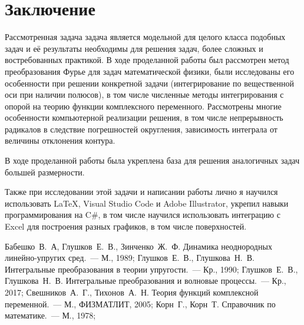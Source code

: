 \documentclass[a4paper, 12pt]{article}
\begin{document}
\section*{Заключение}
Рассмотренная задача задача является модельной для целого класса подобных задач и её результаты необходимы для решения задач, более сложных и востребованных практикой.
В ходе проделанной работы был рассмотрен метод преобразования Фурье для задач математической физики, были исследованы его особенности при решении конкретной задачи (интегрирование по вещественной оси при наличии полюсов), в том числе численные методы интегрирования с опорой на теорию функции комплексного переменного.
Рассмотрены многие особенности компьютерной реализации решения, в том числе непрерывность радикалов в следствие погрешностей округления, зависимость интеграла от величины отклонения контура.

В ходе проделанной работы была укреплена база для решения аналогичных задач большей размерности.

Также при исследовании этой задачи и написании работы лично я научился использовать \LaTeX, Visual Studio Code и Adobe Illustrator, укрепил навыки программирования на C$\#$, в том числе научился использовать интеграцию с Excel для построения разных графиков, в том числе поверхностей.


\begin{thebibliography}{999} 
    Бабешко~В.~А, Глушков~Е.~В., Зинченко~Ж.~Ф. Динамика неоднородных линейно-упругих сред.~---
    М., 1989;
    Глушков~Е.~В., Глушкова~Н.~В. Интегральные преобразования в теории упругости.~---
    Кр., 1990;
    Глушков~Е.~В., Глушкова~Н.~В. Интегральные преобразования и волновые процессы.~---
    Кр., 2017;
    Свешников~А.~Г., Тихонов~А.~Н. Теория функций комплексной переменной.~---
    М., ФИЗМАТЛИТ, 2005;
    Корн~Г., Корн~Т. Справочник по математике.~---
    М., 1978;
\end{thebibliography}
\end{document}
